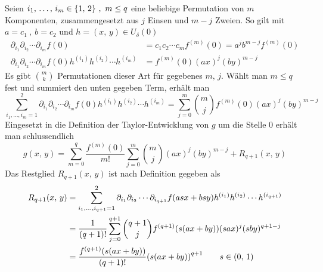 \documentclass[a4paper, 12pt]{scrartcl}
\begin{document}
Seien $i_1,\,\dots,\,i_m \in \qty{1,\,2} ~,~ m \leq q$ eine beliebige Permutation von $m$ Komponenten, zusammengesetzt aus $j$ Einsen und $m-j$ Zweien. So gilt mit $a = c_1 ~,~ b = c_2$ und $h = (x,\,y) \in U_\delta{(0)}$
\begin{align*}
    \partial_{i_1}\partial_{i_2}\cdots\partial_{i_m}f(0) &= c_1c_2\cdots c_mf^{(m)}(0) = a^j b^{m-j}f^{(m)}(0) \\
    \partial_{i_1}\partial_{i_2}\cdots\partial_{i_m}f(0)h^{(i_1)}h^{(i_2)}\cdots h^{(i_m)} &= f^{(m)}(0)(ax)^j(by)^{m-j}
\end{align*}
Es gibt $\binom m k$ Permutationen dieser Art für gegebenes $m,\,j$. Wählt man $m \leq q$ fest und summiert den unten gegeben Term, erhält man
\[
    \sum_{i_1,\dots,i_m=1}^2 \partial_{i_1}\partial_{i_2}\cdots\partial_{i_m}f(0)h^{(i_1)}h^{(i_2)}\cdots h^{(i_m)} =
    \sum_{j=0}^m\binom m jf^{(m)}(0)(ax)^j(by)^{m-j}
\]
Eingesetzt in die Definition der Taylor-Entwicklung von $g$ um die Stelle $0$ erhält man schlussendlich
\[ 
    g(x,\,y) = \sum_{m=0}^q \frac{f^{(m)}(0)}{m!}\sum_{j=0}^m\binom m j(ax)^j(by)^{m-j} + R_{q+1}(x,\,y)
\]
Das Restglied $R_{q+1}(x,\,y)$ ist nach Definition gegeben als
\begin{align*}
    R_{q+1}(x,\,y) &= 
    \sum_{i_1,\dots,i_{q+1}=1}^2 \partial_{i_1}\partial_{i_2}\cdots\partial_{i_{q+1}}f(asx+bsy)h^{(i_1)}h^{(i_2)}\cdots h^{(i_{q+1})} \\
    &= \frac{1}{(q+1)!}\sum_{j=0}^{q+1}\binom {q+1} jf^{(q+1)}(s(ax+by))(sax)^j(sby)^{q+1-j} \\
    &= \frac{f^{(q+1)}(s(ax+by))}{(q+1)!}\qty(s(ax+by))^{q+1} \qquad s \in (0,\,1)
\end{align*}
\end{document}
